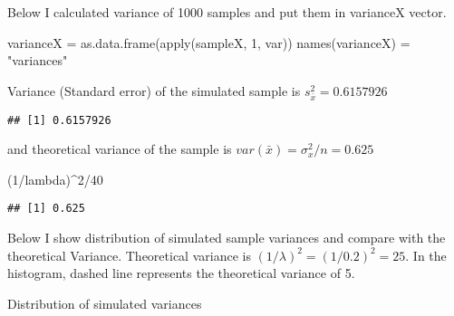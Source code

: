 \documentclass[
]{article}
\newenvironment{Shaded}{\begin{snugshade}}{\end{snugshade}}
\newcommand{\DecValTok}[1]{\textcolor[rgb]{0.00,0.00,0.81}{#1}}
\newcommand{\FunctionTok}[1]{\textcolor[rgb]{0.00,0.00,0.00}{#1}}
\newcommand{\NormalTok}[1]{#1}
\newcommand{\OtherTok}[1]{\textcolor[rgb]{0.56,0.35,0.01}{#1}}
\newcommand{\SpecialCharTok}[1]{\textcolor[rgb]{0.00,0.00,0.00}{#1}}
\newcommand{\StringTok}[1]{\textcolor[rgb]{0.31,0.60,0.02}{#1}}
\begin{document}
Below I calculated variance of 1000 samples and put them in varianceX
vector.

\begin{Shaded}
\begin{Highlighting}[]
\NormalTok{varianceX }\OtherTok{=} \FunctionTok{as.data.frame}\NormalTok{(}\FunctionTok{apply}\NormalTok{(sampleX, }\DecValTok{1}\NormalTok{, var))}
\FunctionTok{names}\NormalTok{(varianceX) }\OtherTok{=} \StringTok{"variances"}
\end{Highlighting}
\end{Shaded}

Variance (Standard error) of the simulated sample is
\(s_\bar{x}^2 = 0.6157926\)

\begin{Shaded}
\end{Shaded}

\begin{verbatim}
## [1] 0.6157926
\end{verbatim}

and theoretical variance of the sample is
\(var(\bar{x}) = \sigma_x^2/n = 0.625\)

\begin{Shaded}
\begin{Highlighting}[]
\NormalTok{(}\DecValTok{1}\SpecialCharTok{/}\NormalTok{lambda)}\SpecialCharTok{\^{}}\DecValTok{2}\SpecialCharTok{/}\DecValTok{40}
\end{Highlighting}
\end{Shaded}

\begin{verbatim}
## [1] 0.625
\end{verbatim}

Below I show distribution of simulated sample variances and compare with
the theoretical Variance. Theoretical variance is
\((1/\lambda)^2 = (1/0.2)^2 = 25\). In the histogram, dashed line
represents the theoretical variance of 5.

Distribution of simulated variances
\end{document}
